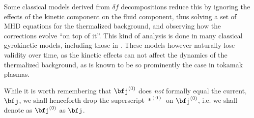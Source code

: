    Some classical models derived from $\delta\!f$ decompositions reduce this by ignoring the effects of the kinetic component on the fluid component, thus solving a set of MHD equations for the thermalized background, and observing how the corrections evolve ``on top of it''. This kind of analysis is done in many classical gyrokinetic models, including those in \cite{Parker_Lee_1993, Dimits_Lee_1993}. These models however naturally lose validity over time, as the kinetic effects can not affect the dynamics of the thermalized background, as is known to be so prominently the case in tokamak plasmas.
    
    While it is worth remembering that $\bfj^{(0)}$ does \emph{not} formally equal the current, $\bfj$, we shall henceforth drop the superscript $*^{(0)}$ on $\bfj^{(0)}$, i.e. we shall denote as $\bfj^{(0)}$ as $\bfj$.
